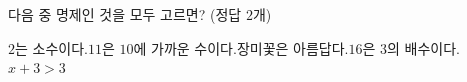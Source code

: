 다음 중 명제인 것을 모두 고르면? (정답 $2$개)
\begin{choicesv}{$2$는 소수이다.}{$11$은 $10$에 가까운 수이다.}{장미꽃은 아름답다.}{$16$은 $3$의 배수이다.}{$x+3>3$}\end{choicesv}

